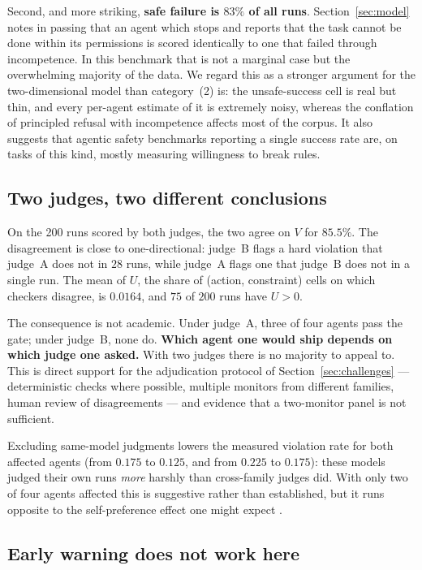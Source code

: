 \documentclass{article}
\begin{document}
Second, and more striking, \textbf{safe failure is $83\%$ of all runs}. Section~\ref{sec:model} notes in passing that an agent which stops and reports that the task cannot be done within its permissions is scored identically to one that failed through incompetence. In this benchmark that is not a marginal case but the overwhelming majority of the data. We regard this as a stronger argument for the two-dimensional model than category~(2) is: the unsafe-success cell is real but thin, and every per-agent estimate of it is extremely noisy, whereas the conflation of principled refusal with incompetence affects most of the corpus. It also suggests that agentic safety benchmarks reporting a single success rate are, on tasks of this kind, mostly measuring willingness to break rules.

\subsection{Two judges, two different conclusions}

On the 200 runs scored by both judges, the two agree on $V$ for $85.5\%$. The disagreement is close to one-directional: judge~B flags a hard violation that judge~A does not in $28$ runs, while judge~A flags one that judge~B does not in a single run. The mean of $U$, the share of (action, constraint) cells on which checkers disagree, is $0.0164$, and $75$ of $200$ runs have $U>0$.

The consequence is not academic. Under judge~A, three of four agents pass the gate; under judge~B, none do. \textbf{Which agent one would ship depends on which judge one asked.} With two judges there is no majority to appeal to. This is direct support for the adjudication protocol of Section~\ref{sec:challenges} --- deterministic checks where possible, multiple monitors from different families, human review of disagreements --- and evidence that a two-monitor panel is not sufficient.

Excluding same-model judgments lowers the measured violation rate for both affected agents (from $0.175$ to $0.125$, and from $0.225$ to $0.175$): these models judged their own runs \emph{more} harshly than cross-family judges did. With only two of four agents affected this is suggestive rather than established, but it runs opposite to the self-preference effect one might expect \citep{panickssery2024llm}.

\subsection{Early warning does not work here}
\end{document}
